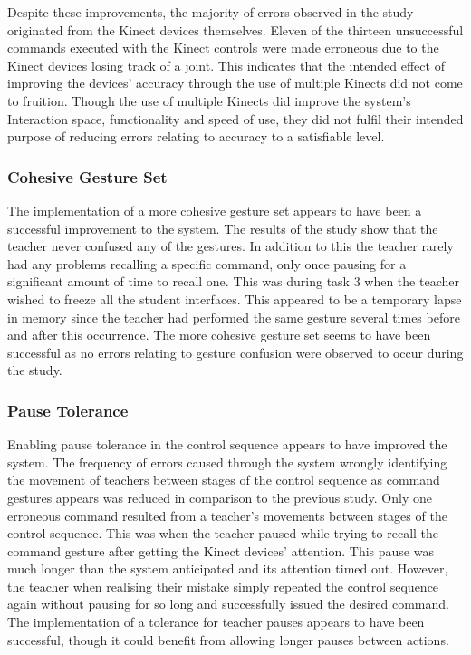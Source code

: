 \documentclass[manuscript, review, screen]{acmart}
\begin{document}
Despite these improvements, the majority of errors observed in the study originated from the Kinect devices themselves.
Eleven of the thirteen unsuccessful commands executed with the Kinect controls were made erroneous due to the Kinect devices losing track of a joint.
This indicates that the intended effect of improving the devices' accuracy through the use of multiple Kinects did not come to fruition.
Though the use of multiple Kinects did improve the system's Interaction space, functionality and speed of use, they did not fulfil their intended purpose of reducing errors relating to accuracy to a satisfiable level.

\subsubsection{Cohesive Gesture Set}

The implementation of a more cohesive gesture set appears to have been a successful improvement to the system.
The results of the study show that the teacher never confused any of the gestures.
In addition to this the teacher rarely had any problems recalling a specific command, only once pausing for a significant amount of time to recall one.
This was during task 3 when the teacher wished to freeze all the student interfaces.
This appeared to be a temporary lapse in memory since the teacher had performed the same gesture several times before and after this occurrence.
The more cohesive gesture set seems to have been successful as no errors relating to gesture confusion were observed to occur during the study.

\subsubsection{Pause Tolerance}

Enabling pause tolerance in the control sequence appears to have improved the system.
The frequency of errors caused through the system wrongly identifying the movement of teachers between stages of the control sequence as command gestures appears was reduced in comparison to the previous study.
Only one erroneous command resulted from a teacher's movements between stages of the control sequence.
This was when the teacher paused while trying to recall the command gesture after getting the Kinect devices' attention.
This pause was much longer than the system anticipated and its attention timed out.
However, the teacher when realising their mistake simply repeated the control sequence again without pausing for so long and successfully issued the desired command.
The implementation of a tolerance for teacher pauses appears to have been successful, though it could benefit from allowing longer pauses between actions.
\end{document}
